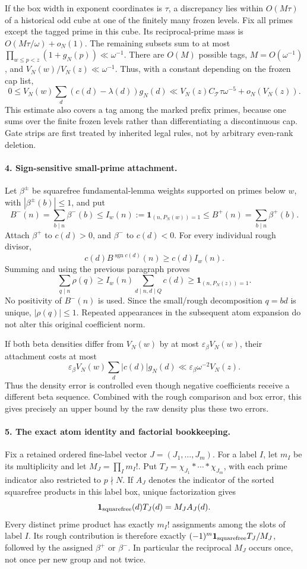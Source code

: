 If the box width in exponent coordinates is $\tau$, a discrepancy
lies within $O(M\tau)$ of a historical odd cube at one of the finitely
many frozen levels. Fix all primes except the tagged prime in this
cube. Its reciprocal-prime mass is $O(M\tau/\omega)+o_N(1)$.
The remaining subsets sum to at most
$\prod_{w\le p<z}(1+g_N(p))\ll\omega^{-1}$.
There are $O(M)$ possible tags, $M=O(\omega^{-1})$, and
$V_N(w)/V_N(z)\ll\omega^{-1}$. Thus, with a constant depending on
the frozen cap list,
\[
 0\le V_N(w)\sum_d(c(d)-\lambda(d))g_N(d)
 \ll V_N(z)C_{\mathcal T}\tau\omega^{-5}+o_N(V_N(z)).
\]
This estimate also covers a tag among the marked prefix primes,
because one sums over the finite frozen levels rather than
differentiating a discontinuous cap. Gate strips are first treated by
inherited legal rules, not by arbitrary even-rank deletion.

\paragraph{4. Sign-sensitive small-prime attachment.}
Let $\beta^\pm$ be squarefree fundamental-lemma weights supported on
primes below $w$, with $|\beta^\pm(b)|\le1$, and put
\[
 B^-(n)=\sum_{b\mid n}\beta^-(b)
 \le I_w(n):=\mathbf1_{(n,P_N(w))=1}
 \le B^+(n)=\sum_{b\mid n}\beta^+(b).
\]
Attach $\beta^+$ to $c(d)>0$, and $\beta^-$ to $c(d)<0$.
For every individual rough divisor,
\[
 c(d)B^{\operatorname{sgn}c(d)}(n)\ge c(d)I_w(n).
\]
Summing and using the previous paragraph proves
\[
 \sum_{q\mid n}\rho(q)\ge I_w(n)\sum_{d\mid n,d\mid Q}c(d)
 \ge\mathbf1_{(n,P_N(z))=1}.
\]
No positivity of $B^-(n)$ is used. Since the small/rough decomposition
$q=bd$ is unique, $|\rho(q)|\le1$. Repeated appearances in the
subsequent atom expansion do not alter this original coefficient norm.

If both beta densities differ from $V_N(w)$ by at most
$\varepsilon_\beta V_N(w)$, their attachment costs at most
\[
 \varepsilon_\beta V_N(w)\sum_d|c(d)|g_N(d)
 \ll \varepsilon_\beta\omega^{-2}V_N(z).
\]
Thus the density error is controlled even though negative coefficients
receive a different beta sequence. Combined with the rough comparison
and box error, this gives precisely an upper bound by the raw density
plus these two errors.

\paragraph{5. The exact atom identity and factorial bookkeeping.}
Fix a retained ordered fine-label vector $J=(J_1,\ldots,J_m)$.
For a label $I$, let $m_I$ be its multiplicity and let
$M_J=\prod_I m_I!$. Put
$T_J=\chi_{J_1}*\cdots*\chi_{J_m}$, with each prime indicator also
restricted to $p\nmid N$. If $A_J$ denotes the indicator of the sorted
squarefree products in this label box, unique factorization gives
\[
 \mathbf1_{\rm squarefree}(d)T_J(d)=M_J A_J(d).
\]
Every distinct prime product has exactly $m_I!$ assignments among the
slots of label $I$. Its rough contribution is therefore exactly
$(-1)^m\mathbf1_{\rm squarefree}T_J/M_J$, followed by the assigned
$\beta^+$ or $\beta^-$. In particular the reciprocal $M_J$ occurs
once, not once per new group and not twice.


